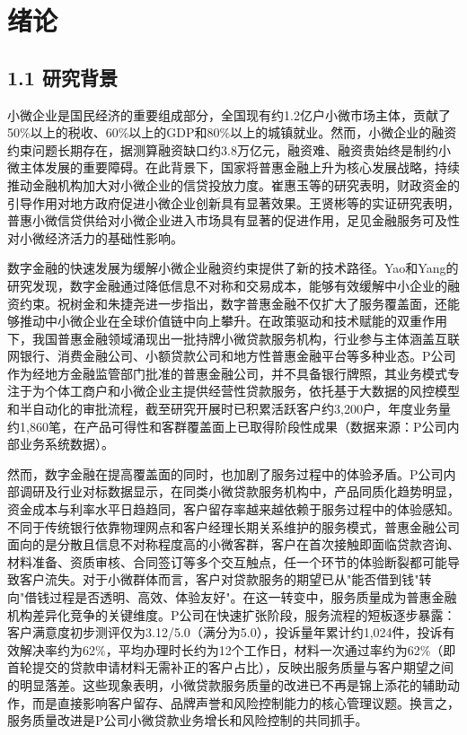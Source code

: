 \chapter{绪论}

\section{1.1 研究背景}

小微企业是国民经济的重要组成部分，全国现有约1.2亿户小微市场主体，贡献了50\%以上的税收、60\%以上的GDP和80\%以上的城镇就业\cite{ref1}。然而，小微企业的融资约束问题长期存在，据测算融资缺口约3.8万亿元，融资难、融资贵始终是制约小微主体发展的重要障碍\cite{ref2}。在此背景下，国家将普惠金融上升为核心发展战略，持续推动金融机构加大对小微企业的信贷投放力度。崔惠玉等的研究表明，财政资金的引导作用对地方政府促进小微企业创新具有显著效果\cite{ref4}。王贤彬等的实证研究表明，普惠小微信贷供给对小微企业进入市场具有显著的促进作用，足见金融服务可及性对小微经济活力的基础性影响\cite{ref2}。\par

数字金融的快速发展为缓解小微企业融资约束提供了新的技术路径。Yao和Yang的研究发现，数字金融通过降低信息不对称和交易成本，能够有效缓解中小企业的融资约束\cite{ref6}。祝树金和朱捷尧进一步指出，数字普惠金融不仅扩大了服务覆盖面，还能够推动中小微企业在全球价值链中向上攀升\cite{ref7}。在政策驱动和技术赋能的双重作用下，我国普惠金融领域涌现出一批持牌小微贷款服务机构，行业参与主体涵盖互联网银行、消费金融公司、小额贷款公司和地方性普惠金融平台等多种业态。P公司作为经地方金融监管部门批准的普惠金融公司，并不具备银行牌照，其业务模式专注于为个体工商户和小微企业主提供经营性贷款服务，依托基于大数据的风控模型和半自动化的审批流程，截至研究开展时已积累活跃客户约3,200户，年度业务量约1,860笔，在产品可得性和客群覆盖面上已取得阶段性成果（数据来源：P公司内部业务系统数据）。\par

然而，数字金融在提高覆盖面的同时，也加剧了服务过程中的体验矛盾。P公司内部调研及行业对标数据显示，在同类小微贷款服务机构中，产品同质化趋势明显，资金成本与利率水平日趋趋同，客户留存率越来越依赖于服务过程中的体验感知。不同于传统银行依靠物理网点和客户经理长期关系维护的服务模式，普惠金融公司面向的是分散且信息不对称程度高的小微客群，客户在首次接触即面临贷款咨询、材料准备、资质审核、合同签订等多个交互触点，任一个环节的体验断裂都可能导致客户流失。对于小微群体而言，客户对贷款服务的期望已从"能否借到钱"转向"借钱过程是否透明、高效、体验友好"。在这一转变中，服务质量成为普惠金融机构差异化竞争的关键维度\cite{ref9}。P公司在快速扩张阶段，服务流程的短板逐步暴露：客户满意度初步测评仅为3.12/5.0（满分为5.0），投诉量年累计约1,024件，投诉有效解决率约为62\%，平均办理时长约为12个工作日，材料一次通过率约为62\%（即首轮提交的贷款申请材料无需补正的客户占比），反映出服务质量与客户期望之间的明显落差。这些现象表明，小微贷款服务质量的改进已不再是锦上添花的辅助动作，而是直接影响客户留存、品牌声誉和风险控制能力的核心管理议题。换言之，服务质量改进是P公司小微贷款业务增长和风险控制的共同抓手。\par

